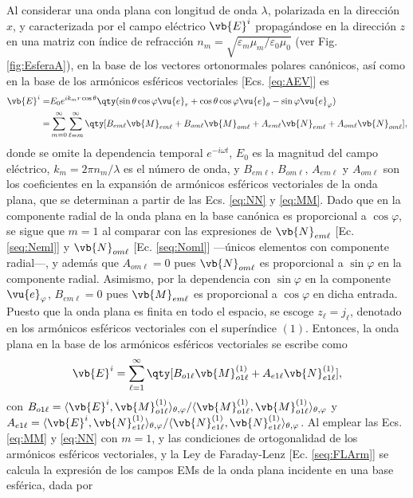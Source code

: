Al considerar una onda plana con longitud de onda $\lambda$, polarizada en la dirección $x$, y caracterizada por el campo eléctrico $\vb{E}^i$ propagándose en la dirección $z$ en una matriz con índice de refracción $n_m = \sqrt{\varepsilon_m\mu_m / \varepsilon_0\mu_0}$ (ver Fig. \ref{fig:EsferaA}), en la base de los vectores ortonormales polares canónicos, así como en la base de los armónicos esféricos vectoriales [Ecs. \eqref{eq:AEV}] es 
	\begin{align*}
\vb{E}^i = & E_0 e^{ik_mr\cos\theta} \qty(\sin\theta\cos\varphi \vu{e}_r + 
								\cos\theta\cos\varphi\vu{e}_\theta-\sin\varphi\vu{e}_\varphi)\notag\\
	 =& \sum_{m=0}^\infty\sum_{\ell=m}^\infty \qty[ B_{em\ell}\vb{M}_{em\ell} 
	 	+ B_{om\ell}\vb{M}_{om\ell} +A_{em\ell}\vb{N}_{em\ell} + A_{om\ell}\vb{N}_{om\ell}],
	\end{align*}
donde se omite la dependencia temporal $e^{-i\omega t}$, $E_0$ es la magnitud del campo eléctrico, $k_m=2\pi n_m/\lambda$ es el número de onda,  y  $B_{em\ell},\, B_{om\ell},\, A_{em\ell}$ y $ A_{om\ell}$ son los coeficientes en la expansión de armónicos esféricos vectoriales de la onda plana, que se determinan a partir de las Ecs. \eqref{eq:NN} y \eqref{eq:MM}. Dado que en la componente radial de la onda plana en la base canónica es proporcional a $\cos\varphi$, se sigue que $m=1$ al comparar con las expresiones de $\vb{N}_{em\ell}$ [Ec. \eqref{seq:Neml}] y $\vb{N}_{om\ell}$ [Ec. \eqref{seq:Noml}] ---únicos elementos con componente radial---, y además que $A_{om\ell}=0$ pues $\vb{N}_{om\ell}$ es proporcional a $\sin\varphi$ en la componente radial. Asimismo, por la dependencia con $\sin\varphi$ en la componente  $\vu{e}_\varphi$, $B_{em\ell}=0$ pues $\vb{M}_{em\ell}$ es proporcional a $\cos\varphi$ en dicha entrada. Puesto que la onda plana es finita en todo el espacio, se escoge $z_\ell = j_\ell$, denotado en los armónicos esféricos vectoriales con el superíndice $(1)$. Entonces, la onda plana en la base de los armónicos esféricos vectoriales se escribe como 
	\begin{align*}
	\vb{E}^i = \sum_{\ell=1}^\infty \qty[B_{o1\ell}\vb{M}_{o1\ell}^{(1)} + A_{e1\ell}\vb{N}_{e1\ell}^{(1)}],
	\end{align*}
con $B_{o1\ell} = \langle \vb{E}^i, \vb{M}_{o1\ell}^{(1)}  \rangle_{\theta,\varphi} / \langle \vb{M}_{o1\ell}^{(1)} ,\vb{M}_{o1\ell}^{(1)} \rangle_{\theta,\varphi}$ y $ A_{e1\ell} = \langle \vb{E}^i, \vb{N}_{e1\ell}^{(1)} \rangle_{\theta,\varphi} / \langle \vb{N}_{e1\ell}^{(1)},\vb{N}_{e1\ell}^{(1)} \rangle_{\theta,\varphi}$. Al emplear las Ecs. \eqref{eq:MM} y \eqref{eq:NN} con $m=1$, y las condiciones de ortogonalidad de los armónicos esféricos vectoriales, y la Ley de Faraday-Lenz [Ec. \eqref{seq:FLArm}] se calcula la expresión de los campos EMs de la onda plana incidente en una base esférica, dada por 

